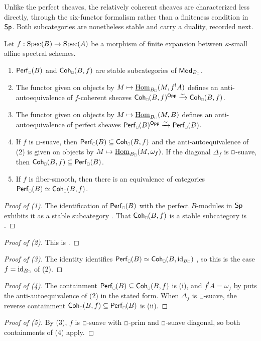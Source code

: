 Unlike the perfect sheaves, the relatively coherent sheaves are characterized less directly, through the six-functor formalism rather than a finiteness condition in $\mathsf{Sp}$. Both subcategories are nonetheless stable and carry a duality, recorded next.
\begin{proposition}\label{prop: f-coherent and perfect sheaves affine}
    Let $f:\operatorname{Spec}(B)\to\operatorname{Spec}(A)$ be a morphism of finite expansion between $\kappa$-small affine spectral schemes. 
    \begin{enumerate}
        \item $\Perf_{\sld}(B)$ and $\Coh_{\sld}(B,f)$ are stable subcategories of $\Mod_{B_{\sld}}$. 
        \item The functor given on objects by $M\mapsto \intHom_{B_{\sld}}(M, f^{!}A)$ defines an anti-autoequivalence of $f$-coherent sheaves $\Coh_{\sld}(B,f)^{\Opp}\xrightarrow{\sim}\Coh_{\sld}(B,f)$. 
        \item The functor given on objects by $M\mapsto \intHom_{B_{\sld}}(M, B)$ defines an anti-autoequivalence of perfect sheaves $\Perf_{\sld}(B)^{\Opp}\xrightarrow{\sim}\Perf_{\sld}(B)$. 
        \item If $f$ is $\msld$-suave, then $\Perf_{\sld}(B)\subseteq\Coh_{\sld}(B,f)$ and the anti-autoequivalence of (2) is given on objects by $M\mapsto\intHom_{B_{\sld}}(M,\omega_{f})$. If the diagonal $\Delta_{f}$ is $\msld$-suave, then $\Coh_{\sld}(B,f)\subseteq\Perf_{\sld}(B)$.
        \item If $f$ is fiber-smooth, then there is an equivalence of categories $\Perf_{\sld}(B)\simeq\Coh_{\sld}(B,f)$. 
    \end{enumerate}
\end{proposition}
\begin{proof}[Proof of (1)]
    The identification of $\Perf_{\sld}(B)$ with the perfect $B$-modules in $\mathsf{Sp}$  exhibits it as a stable subcategory \cite[Prop. 7.2.4.2]{HA}. That $\Coh_{\sld}(B,f)$ is a stable subcategory is \cite[Cor. 4.4.13]{HeyerMann6FF}.
\end{proof}
\begin{proof}[Proof of (2)]
    This is \cite[Lem. 4.4.4 \& 4.4.17]{HeyerMann6FF}.
\end{proof}
\begin{proof}[Proof of (3)]
    The identity identifies $\Perf_{\sld}(B)\simeq\Coh_{\sld}(B,\id_{B_{\sld}})$ \cite[Ex. 4.4.3]{HeyerMann6FF}, so this is the case $f=\id_{B_{\sld}}$ of (2).
\end{proof}
\begin{proof}[Proof of (4)]
    The containment $\Perf_{\sld}(B)\subseteq\Coh_{\sld}(B,f)$ is \cite[Cor. 4.5.18]{HeyerMann6FF} (i), and $f^{!}A=\omega_{f}$ by  puts the anti-autoequivalence of (2) in the stated form. When $\Delta_{f}$ is $\msld$-suave, the reverse containment $\Coh_{\sld}(B,f)\subseteq\Perf_{\sld}(B)$ is \cite[Cor. 4.5.18]{HeyerMann6FF} (ii).
\end{proof}
\begin{proof}[Proof of (5)]
    By  (3), $f$ is $\msld$-suave with $\msld$-prim and $\msld$-suave diagonal, so both containments of (4) apply.
\end{proof}

